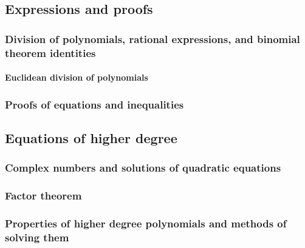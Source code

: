 \subsection{Expressions and proofs}

\subsubsection{Division of polynomials, rational expressions, and binomial theorem identities}
\paragraph{Euclidean division of polynomials}

\subsubsection{Proofs of equations and inequalities}

\subsection{Equations of higher degree}

\subsubsection{Complex numbers and solutions of quadratic equations}
\subsubsection{Factor theorem}
\subsubsection{Properties of higher degree polynomials and methods of solving them}
